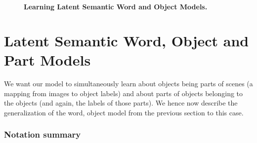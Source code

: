 \begin{figure}[t!]
  \begin{center}
    \caption[Latent Semantic Word and Object Models]{{\bf Learning Latent Semantic Word and Object Models.}}
    \label{fig:wsabie}
    \end{center}
\end{figure}



\section{Latent Semantic Word, Object and Part Models}\label{sec:jmodels}
 

We want our model to simultaneously learn about objects being parts of scenes 
(a mapping from images to object labels) and about parts of objects
belonging to the objects (and again, the labels of those parts).
We hence now describe the generalization of the word, object model 
from the previous section to this case. 

\subsubsection*{Notation summary}

